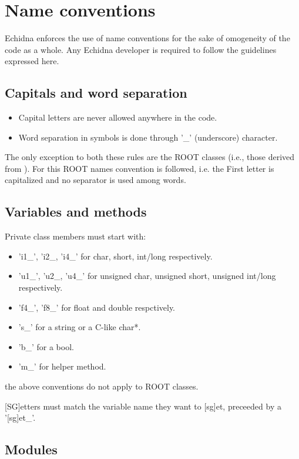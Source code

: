 \section{Name conventions}
\label{sec:names}

Echidna enforces the use of name conventions for the sake of omogeneity of the code as a whole.
Any Echidna developer is required to follow the guidelines expressed here.


\subsection{Capitals and word separation}
\begin{itemize}
\item 
  Capital letters are never allowed anywhere in the code. 
\item 
  Word separation in symbols is done through '\_' (underscore) character.
\end{itemize}

The only exception to both these rules are the ROOT classes (i.e., those derived from ).
For this ROOT names convention is followed, i.e. the First letter is capitalized and no separator is used among words. 


\subsection{Variables and methods}
Private class members must start with:
\begin{itemize}
\item 
  'i1\_', 'i2\_, 'i4\_' for char, short, int/long respectively.
\item 
  'u1\_', 'u2\_, 'u4\_' for unsigned char, unsigned short, unsigned int/long respectively.
\item 
  'f4\_', 'f8\_' for float and double respctively.
\item 
  's\_' for a string or a C-like char*. 
\item 
  'b\_' for a bool.
\item
  'm\_' for helper method.
\end{itemize}

the above conventions do not apply to ROOT classes.

[SG]etters must match the variable name they want to [sg]et, preceeded by a '[sg]et\_'.


\subsection{Modules}

